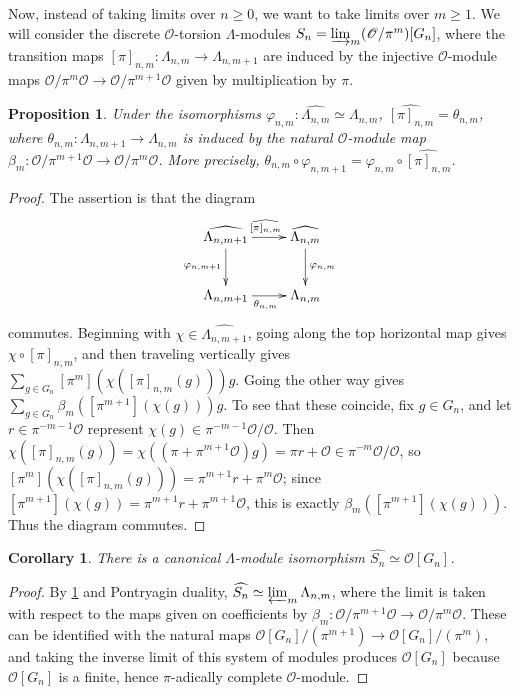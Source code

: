\documentclass[12 pt]{amsart}
\theoremstyle{plain}
\newtheorem{prop}[thm]{Proposition}
\newtheorem{cor}[thm]{Corollary}
\theoremstyle{definition}
\numberwithin{equation}{section}
\numberwithin{table}{section}
\begin{document}
\indent Now, instead of taking limits over $n\geq 0$, we want to take limits over $m\geq 1$. We will consider the discrete $\mathscr{O}$-torsion $\Lambda$-modules $S_n=\varinjlim_m(\mathscr{O}/\pi^m)[G_n]$, where the transition maps $[\pi]_{n,m}:\Lambda_{n,m}\rightarrow\Lambda_{n,m+1}$ are induced by the injective $\mathscr{O}$-module maps $\mathscr{O}/\pi^m\mathscr{O}\to\mathscr{O}/\pi^{m+1}\mathscr{O}$ given by multiplication by $\pi$.
\begin{prop}
\label{mult-by-pi-lim}
Under the isomorphisms $\varphi_{n,m}:\widehat{\Lambda_{n,m}}\simeq\Lambda_{n,m}$, $\widehat{[\pi]_{n,m}}=\theta_{n,m}$, where $\theta_{n,m}:\Lambda_{n,m+1}\rightarrow\Lambda_{n,m}$ is induced by the natural $\mathscr{O}$-module map $\beta_m:\mathscr{O}/\pi^{m+1}\mathscr{O}\rightarrow\mathscr{O}/\pi^m\mathscr{O}$. More precisely, $\theta_{n,m}\circ\varphi_{n,m+1}=\varphi_{n,m}\circ\widehat{[\pi]_{n,m}}$.
\end{prop}
\begin{proof}
The assertion is that the diagram
\begin{equation*}
\xymatrix{\widehat{\Lambda_{n,m+1}} \ar[r]^{\widehat{[\pi]_{n,m}}} \ar[d]_{\varphi_{n,m+1}} & \widehat{\Lambda_{n,m}}\ar[d]^{\varphi_{n,m}}\\
\Lambda_{n,m+1} \ar[r]_{\theta_{n,m}} & \Lambda_{n,m}}
\end{equation*}
commutes. Beginning with $\chi\in\widehat{\Lambda_{n,m+1}}$, going along the top horizontal map gives $\chi\circ[\pi]_{n,m}$, and then traveling vertically gives $\sum_{g\in G_n}[\pi^m](\chi([\pi]_{n,m}(g))) g$. Going the other way gives $\sum_{g\in G_n}\beta_m([\pi^{m+1}](\chi(g)))g$. To see that these coincide, fix $g\in G_n$, and let $r\in\pi^{-m-1}\mathscr{O}$ represent $\chi(g)\in\pi^{-m-1}\mathscr{O}/\mathscr{O}$. Then $\chi([\pi]_{n,m}(g))=\chi((\pi+\pi^{m+1}\mathscr{O})g)=\pi r+\mathscr{O}\in\pi^{-m}\mathscr{O}/\mathscr{O}$, so $[\pi^m](\chi([\pi]_{n,m}(g)))=\pi^{m+1}r+\pi^m\mathscr{O}$; since $[\pi^{m+1}](\chi(g))=\pi^{m+1}r+\pi^{m+1}\mathscr{O}$, this is exactly $\beta_m([\pi^{m+1}](\chi(g)))$. Thus the diagram commutes.
\end{proof}
\begin{cor}
\label{discrete-lim-coefficient}
There is a canonical $\Lambda$-module isomorphism $\widehat{S_n}\simeq\mathscr{O}[G_n]$.
\end{cor}
\begin{proof}
By \cref{mult-by-pi-lim} and Pontryagin duality, $\widehat{S_n}\simeq\varprojlim_m\Lambda_{n,m}$, where the limit is taken with respect to the maps given on coefficients by $\beta_m:\mathscr{O}/\pi^{m+1}\mathscr{O}\rightarrow\mathscr{O}/\pi^m\mathscr{O}$. These can be identified with the natural maps $\mathscr{O}[G_n]/(\pi^{m+1})\rightarrow\mathscr{O}[G_n]/(\pi^m)$, and taking the inverse limit of this system of modules produces $\mathscr{O}[G_n]$ because $\mathscr{O}[G_n]$ is a finite, hence $\pi$-adically complete $\mathscr{O}$-module.
\end{proof}
\end{document}

